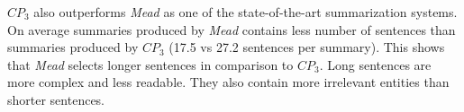 $CP_3$ also outperforms \emph{Mead} as one of the state-of-the-art summarization systems. 
On average summaries produced by \emph{Mead} contains less number of sentences than summaries produced by $CP_3$ (17.5 vs 27.2 sentences per summary).
This shows that \emph{Mead} selects longer sentences in comparison to \emph{$CP_3$}. 
Long sentences are more complex and less readable. 
They also contain more irrelevant entities than shorter sentences.





